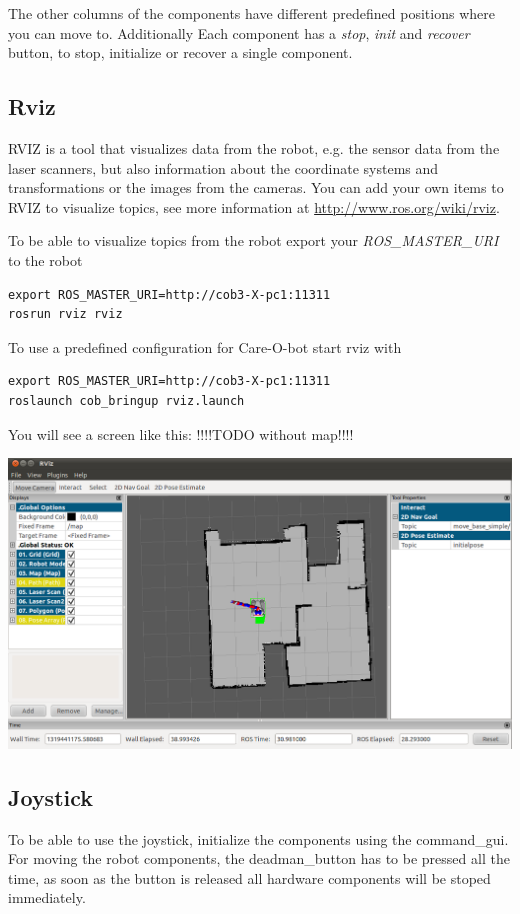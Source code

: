 The other columns of the components have different predefined positions where you can move to. Additionally Each component has a \textit{stop}, \textit{init} and \textit{recover} button, to stop, initialize or recover a single component.

\subsection{Rviz}
RVIZ is a tool that visualizes data from the robot, e.g. the sensor data from the laser scanners, but also information about the coordinate systems and transformations or the images from the cameras. You can add your own items to RVIZ to visualize topics, see more information at \url{http://www.ros.org/wiki/rviz}.

To be able to visualize topics from the robot export your \textit{ROS\_MASTER\_URI} to the robot
\begin{lstlisting}
export ROS_MASTER_URI=http://cob3-X-pc1:11311
rosrun rviz rviz
\end{lstlisting}

To use a predefined configuration for Care-O-bot start rviz with
\begin{lstlisting}
export ROS_MASTER_URI=http://cob3-X-pc1:11311
roslaunch cob_bringup rviz.launch
\end{lstlisting}

You will see a screen like this: !!!!TODO without map!!!!
\begin {center}
\includegraphics[width=1\textwidth]{images/rviz.png}
\end{center}

\subsection{Joystick}
To be able to use the joystick, initialize the components using the command\_gui. For moving the robot components, the deadman\_button has to be pressed all the time, as soon as the button is released all hardware components will be stoped immediately. 

